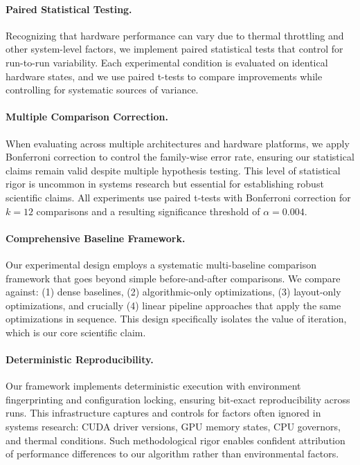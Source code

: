 \documentclass{article}
\begin{document}
\paragraph{Paired Statistical Testing.}
Recognizing that hardware performance can vary due to thermal throttling and other system-level factors, we implement paired statistical tests that control for run-to-run variability. Each experimental condition is evaluated on identical hardware states, and we use paired t-tests to compare improvements while controlling for systematic sources of variance.

\paragraph{Multiple Comparison Correction.}
When evaluating across multiple architectures and hardware platforms, we apply Bonferroni correction to control the family-wise error rate, ensuring our statistical claims remain valid despite multiple hypothesis testing. This level of statistical rigor is uncommon in systems research but essential for establishing robust scientific claims.
All experiments use paired t-tests with Bonferroni correction for $k=12$ comparisons and a resulting significance threshold of $\alpha=0.004$.

\paragraph{Comprehensive Baseline Framework.}
Our experimental design employs a systematic multi-baseline comparison framework that goes beyond simple before-and-after comparisons. We compare against: (1) dense baselines, (2) algorithmic-only optimizations, (3) layout-only optimizations, and crucially (4) linear pipeline approaches that apply the same optimizations in sequence. This design specifically isolates the value of iteration, which is our core scientific claim.

\paragraph{Deterministic Reproducibility.}
Our framework implements deterministic execution with environment fingerprinting and configuration locking, ensuring bit-exact reproducibility across runs. This infrastructure captures and controls for factors often ignored in systems research: CUDA driver versions, GPU memory states, CPU governors, and thermal conditions. Such methodological rigor enables confident attribution of performance differences to our algorithm rather than environmental factors.
\end{document}
